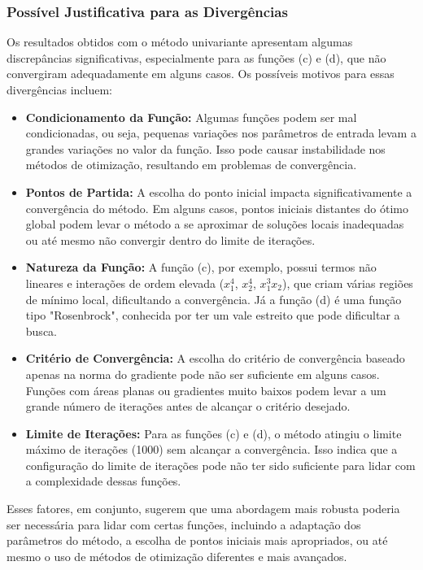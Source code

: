 \documentclass[a4paper, 12pt]{article}
\begin{document}
\subsubsection{Possível Justificativa para as Divergências}

Os resultados obtidos com o método univariante apresentam algumas discrepâncias significativas, especialmente para as funções (c) e (d), que não convergiram adequadamente em alguns casos. Os possíveis motivos para essas divergências incluem:

\begin{itemize}
    \item \textbf{Condicionamento da Função:} Algumas funções podem ser mal condicionadas, ou seja, pequenas variações nos parâmetros de entrada levam a grandes variações no valor da função. Isso pode causar instabilidade nos métodos de otimização, resultando em problemas de convergência.
    \item \textbf{Pontos de Partida:} A escolha do ponto inicial impacta significativamente a convergência do método. Em alguns casos, pontos iniciais distantes do ótimo global podem levar o método a se aproximar de soluções locais inadequadas ou até mesmo não convergir dentro do limite de iterações.
    \item \textbf{Natureza da Função:} A função (c), por exemplo, possui termos não lineares e interações de ordem elevada ($x_1^4$, $x_2^4$, $x_1^3x_2$), que criam várias regiões de mínimo local, dificultando a convergência. Já a função (d) é uma função tipo "Rosenbrock", conhecida por ter um vale estreito que pode dificultar a busca.
    \item \textbf{Critério de Convergência:} A escolha do critério de convergência baseado apenas na norma do gradiente pode não ser suficiente em alguns casos. Funções com áreas planas ou gradientes muito baixos podem levar a um grande número de iterações antes de alcançar o critério desejado.
    \item \textbf{Limite de Iterações:} Para as funções (c) e (d), o método atingiu o limite máximo de iterações (1000) sem alcançar a convergência. Isso indica que a configuração do limite de iterações pode não ter sido suficiente para lidar com a complexidade dessas funções.
\end{itemize}

Esses fatores, em conjunto, sugerem que uma abordagem mais robusta poderia ser necessária para lidar com certas funções, incluindo a adaptação dos parâmetros do método, a escolha de pontos iniciais mais apropriados, ou até mesmo o uso de métodos de otimização diferentes e mais avançados.
\end{document}
